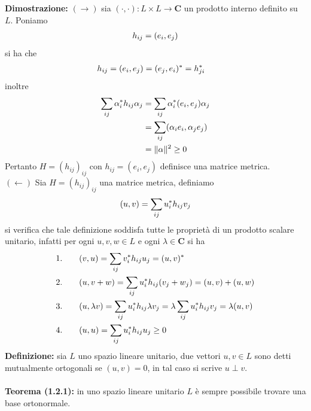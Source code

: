 \documentclass{article}
\begin{document}
\textbf{Dimostrazione:} $(\rightarrow)$ sia $(\cdot, \cdot) : L \times L \rightarrow \mathbf{C}$ un prodotto interno definito su $L$. Poniamo
\begin{gather}
    h_{ij} = (e_i, e_j) \notag
\end{gather}
si ha che
\begin{align}
    h_{ij} &= (e_i, e_j) = (e_j, e_i)^* = h^*_{ji} \notag
\end{align}
inoltre
\begin{align}
    \sum_{ij}\alpha^*_ih_{ij}\alpha_j &= \sum_{ij}\alpha^*_i(e_i, e_j)\alpha_j \notag \\
    &= \sum_{ij} (\alpha_ie_i, \alpha_je_j) \notag \\
    &= \|\alpha\|^2 \geq 0 \notag
\end{align}
Pertanto $H = (h_{ij})_{ij}$ con $h_{ij} = (e_i, e_j)$ definisce una matrice metrica. \\
$(\leftarrow)$ Sia $H = (h_{ij})_{ij}$ una matrice metrica, definiamo
\begin{gather}
    (u, v) = \sum_{ij}u^*_ih_{ij}v_j \notag
\end{gather}
si verifica che tale definizione soddisfa tutte le proprietà di un prodotto scalare unitario, infatti per ogni $u, v, w \in L$ e ogni $\lambda \in \mathbf{C}$ si ha
\begin{align}
    1. \qquad &(v, u) = \sum_{ij}v^*_ih_{ij}u_j = (u, v)^* \notag \\
    2. \qquad &(u, v + w) = \sum_{ij}u^*_ih_{ij}(v_j + w_j) = (u, v) + (u, w) \notag \\
    3. \qquad &(u, \lambda v) = \sum_{ij}u^*_ih_{ij}\lambda v_j = \lambda\sum_{ij}u^*_ih_{ij}v_j = \lambda(u, v) \notag \\
    4. \qquad &(u, u) = \sum_{ij}u^*_ih_{ij}u_j \geq 0 \notag
\end{align}
\textbf{Definizione:} sia $L$ uno spazio lineare unitario, due vettori $u, v \in L$ sono detti mutualmente ortogonali se $(u, v) = 0$, in tal caso si scrive $u \perp v$. \\ \\
\textbf{Teorema (1.2.1):} in uno spazio lineare unitario $L$ è sempre possibile trovare una base ortonormale. \\
\end{document}
